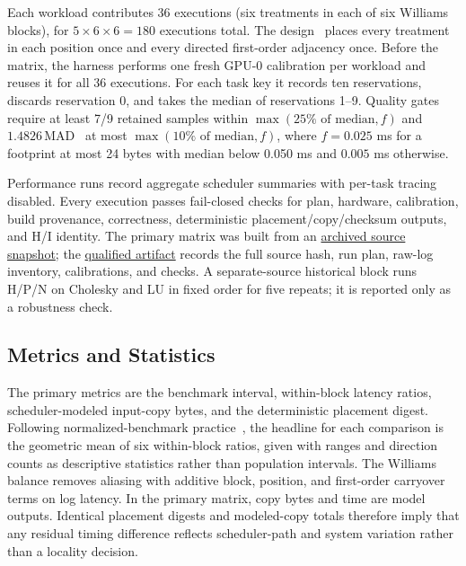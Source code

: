 \documentclass[sigconf]{acmart}
\begin{document}
Each workload contributes 36 executions (six treatments in each of six Williams blocks), for \(5\times6\times6=180\) executions total. The design~\citep{williams1949designs} places every treatment in each position once and every directed first-order adjacency once. Before the matrix, the harness performs one fresh GPU-0 calibration per workload and reuses it for all 36 executions. For each task key it records ten reservations, discards reservation 0, and takes the median of reservations 1--9. Quality gates require at least 7/9 retained samples within \(\max(25\%\text{ of median},f)\) and \(1.4826\,\mathrm{MAD}\)~\citep{rousseeuw1993alternatives} at most \(\max(10\%\text{ of median},f)\), where \(f=0.025\) ms for a footprint at most 24 bytes with median below 0.050 ms and \(0.005\) ms otherwise.

Performance runs record aggregate scheduler summaries with per-task tracing disabled. Every execution passes fail-closed checks for plan, hardware, calibration, build provenance, correctness, deterministic placement/copy/checksum outputs, and H/I identity. The primary matrix was built from an \href{https://github.com/thynics/stf_ics/commit/e3cfeaf36b6a8e3c4b3a1754270aa2ecde09647a}{archived source snapshot}; the \href{https://github.com/thynics/stf_ics/blob/58cb4c57a3279d79f7b2205d5eb42a1016e53425/jobs/20260721-151200-ross-reviewer-counterbalanced-baselines-6repeat-retry1/results/summary.md}{qualified artifact} records the full source hash, run plan, raw-log inventory, calibrations, and checks. A separate-source historical block runs H/P/N on Cholesky and LU in fixed order for five repeats; it is reported only as a robustness check.

\subsection{Metrics and Statistics}\label{sec:metrics-statistics}

The primary metrics are the benchmark interval, within-block latency ratios, scheduler-modeled input-copy bytes, and the deterministic placement digest. Following normalized-benchmark practice~\citep{fleming1986geomean}, the headline for each comparison is the geometric mean of six within-block ratios, given with ranges and direction counts as descriptive statistics rather than population intervals. The Williams balance removes aliasing with additive block, position, and first-order carryover terms on log latency. In the primary matrix, copy bytes and time are model outputs. Identical placement digests and modeled-copy totals therefore imply that any residual timing difference reflects scheduler-path and system variation rather than a locality decision.
\end{document}
